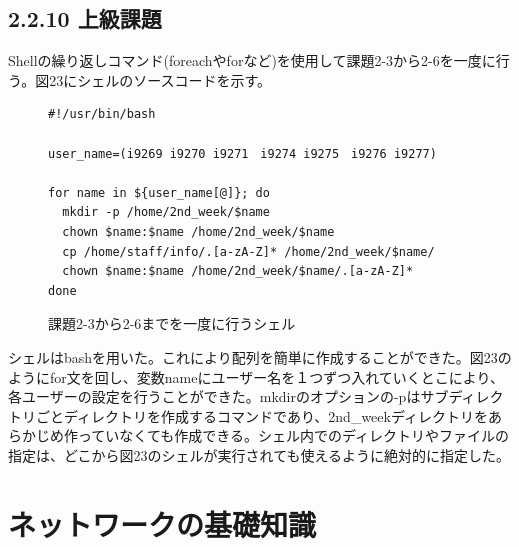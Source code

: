 \documentclass[12pt]{jreport}
\begin{document}
            \subsection*{2.2.10 上級課題}
                Shellの繰り返しコマンド(foreachやforなど)を使用して課題2-3から2-6を一度に行う。図23にシェルのソースコードを示す。
                \begin{figure}[H]
                    \begin{center}
                        \begin{screen}
                            \begin{verbatim}
#!/usr/bin/bash

user_name=(i9269 i9270 i9271　i9274 i9275　i9276 i9277)

for name in ${user_name[@]}; do
  mkdir -p /home/2nd_week/$name
  chown $name:$name /home/2nd_week/$name
  cp /home/staff/info/.[a-zA-Z]* /home/2nd_week/$name/
  chown $name:$name /home/2nd_week/$name/.[a-zA-Z]*
done
                            \end{verbatim}
                        \end{screen}
                        \caption{課題2-3から2-6までを一度に行うシェル}
                        \label{23}
                    \end{center}
                \end{figure}
                シェルはbashを用いた。これにより配列を簡単に作成することができた。図23のようにfor文を回し、変数nameにユーザー名を１つずつ入れていくとこにより、各ユーザーの設定を行うことができた。mkdirのオプションの-pはサブディレクトリごとディレクトリを作成するコマンドであり、2nd\_weekディレクトリをあらかじめ作っていなくても作成できる。シェル内でのディレクトリやファイルの指定は、どこから図23のシェルが実行されても使えるように絶対的に指定した。
        \section*{ネットワークの基礎知識}
\end{document}
